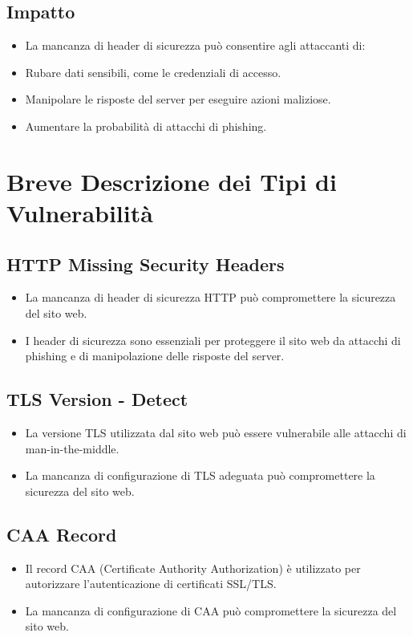 \subsection{Impatto}
\begin{itemize}
\item La mancanza di header di sicurezza può consentire agli attaccanti di:
\item Rubare dati sensibili, come le credenziali di accesso.
\item Manipolare le risposte del server per eseguire azioni maliziose.
\item Aumentare la probabilità di attacchi di phishing.
\end{itemize}
\section{Breve Descrizione dei Tipi di Vulnerabilità}

\subsection{HTTP Missing Security Headers}
\begin{itemize}
\item La mancanza di header di sicurezza HTTP può compromettere la sicurezza del sito web.
\item I header di sicurezza sono essenziali per proteggere il sito web da attacchi di phishing e di manipolazione delle risposte del server.
\end{itemize}
\subsection{TLS Version - Detect}
\begin{itemize}
\item La versione TLS utilizzata dal sito web può essere vulnerabile alle attacchi di man-in-the-middle.
\item La mancanza di configurazione di TLS adeguata può compromettere la sicurezza del sito web.
\end{itemize}
\subsection{CAA Record}
\begin{itemize}
\item Il record CAA (Certificate Authority Authorization) è utilizzato per autorizzare l'autenticazione di certificati SSL/TLS.
\item La mancanza di configurazione di CAA può compromettere la sicurezza del sito web.
\end{itemize}

